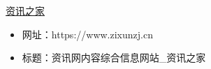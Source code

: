 \href{https://www.zixunzj.cn}{资讯之家}
\begin{itemize}
\item 网址：https://www.zixunzj.cn
\item 标题：资讯网内容综合信息网站_资讯之家
\end{itemize}

